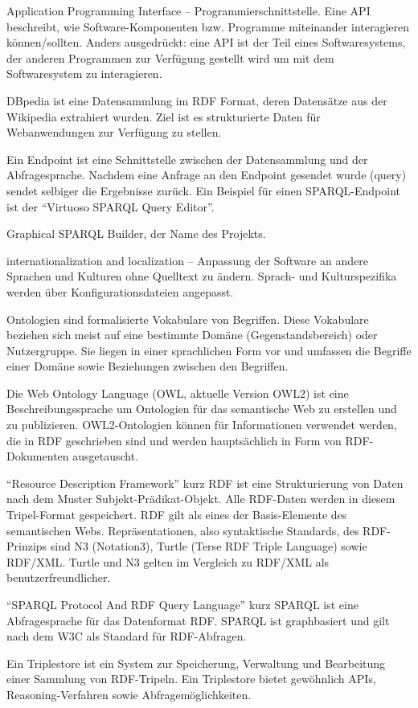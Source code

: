 {Application Programming Interface -- Programmierschnittstelle.
Eine API be\hack{-\break}schreibt, wie Software-Komponenten
bzw. Programme miteinander interagieren können/sollten. Anders
ausgedrückt: eine API ist der Teil eines Softwaresystems, der anderen
Programmen zur Verfügung gestellt wird um mit dem Softwaresystem zu
interagieren.}

{DBpedia ist eine Datensammlung im RDF Format, deren Datensätze aus der Wikipedia extrahiert wurden. Ziel ist es strukturierte Daten für Webanwendungen zur Verfügung zu stellen.
\cite{dbpedia-wikipedia,dbpedia,dbpedia-datasets}}

{Ein Endpoint ist eine Schnittstelle zwischen der Datensammlung und der 
Abfragesprache. Nachdem eine Anfrage an den Endpoint gesendet wurde (query)  sendet selbiger die Ergebnisse zurück. Ein Beispiel für einen SPARQL-Endpoint ist der “Virtuoso SPARQL Query Editor”. \cite{dbpedia-sparql}}

{Graphical SPARQL Builder, der Name des Projekts. \cite{swp14-gsb}}

{internationalization and localization -- Anpassung der Software an andere Sprachen und Kulturen ohne Quelltext zu ändern. Sprach- und Kulturspezifika werden über Konfigurationsdateien angepasst.}

{Ontologien sind formalisierte Vokabulare von Begriffen. Diese Vokabulare beziehen sich meist auf eine bestimmte Domäne (Gegenstandsbereich) oder Nutzergruppe. Sie liegen in einer sprachlichen Form vor und umfassen die Begriffe einer Domäne sowie Beziehungen zwischen den Begriffen. \cite{owl,ontologie-wiki,fraunhofer}
}

{Die Web Ontology Language (OWL, aktuelle Version OWL2) ist eine Beschreibungssprache um Ontologien für das semantische Web zu erstellen und zu publizieren. OWL2-Ontologien können für Informationen verwendet werden, die in RDF geschrieben sind und werden hauptsächlich in Form von RDF-Dokumenten ausgetauscht.
\cite{owl}
}

{“Resource Description Framework” kurz RDF ist eine Strukturierung von Daten nach
dem Muster Subjekt-Prädikat-Objekt. Alle RDF-Daten werden in diesem Tripel-Format 
gespeichert. RDF gilt als eines der Basis-Elemente des semantischen Webs.
Repräsentationen, also syntaktische Standards, des RDF-Prinzips sind N3 (Notation3), 
Turtle (Terse RDF Triple Language) sowie RDF/XML. Turtle und N3 gelten im Vergleich zu RDF/XML als benutzerfreundlicher. \cite{rdf-primer,rdf-wiki,rdf-xml-wiki}}

{“SPARQL Protocol And RDF Query Language” kurz SPARQL ist eine Abfragesprache für das Datenformat RDF. SPARQL ist graphbasiert und gilt nach dem W3C als Standard für RDF-Abfragen. \cite{w3c-rdf-sparql-query,sparql-wiki}}

{Ein Triplestore ist ein System zur Speicherung, Verwaltung und Bearbeitung einer
 Sammlung von RDF-Tripeln. Ein Triplestore bietet gewöhnlich APIs,
 Rea\-so\-ning-Verfahren sowie Abfragemöglichkeiten. \cite{fraunhofer}}

